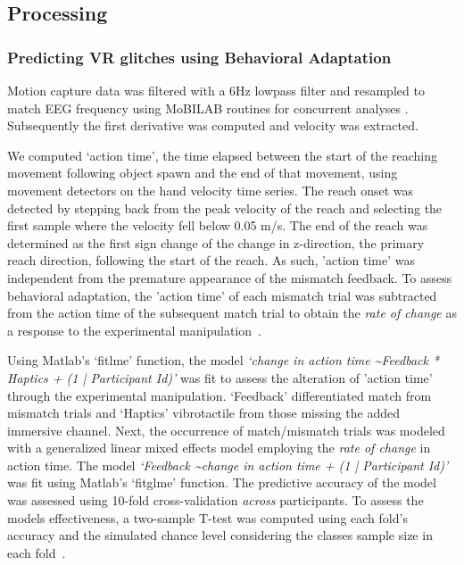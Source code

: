 \subsection{Processing}

\subsubsection{Predicting VR glitches using Behavioral Adaptation}

Motion capture data was filtered with a 6Hz lowpass filter and resampled to match EEG frequency using MoBILAB routines for concurrent analyses \cite{Ojeda2014}. Subsequently the first derivative was computed and velocity was extracted. 

We computed `action time', the time elapsed between the start of the reaching movement following object spawn and the end of that movement, using movement detectors on the hand velocity time series. The reach onset was detected by stepping back from the peak velocity of the reach and selecting the first sample where the velocity fell below 0.05 m/s. The end of the reach was determined as the first sign change of the change in z-direction, the primary reach direction, following the start of the reach. As such, 'action time' was independent from the premature appearance of the mismatch feedback. To assess behavioral adaptation, the 'action time' of each mismatch trial was subtracted from the action time of the subsequent match trial to obtain the \textit{rate of change} as a response to the experimental manipulation~\cite{Dutilh2012}.

Using Matlab's `fitlme' function, the model \textit{`change in action time \textasciitilde  Feedback * Haptics + (1 | Participant Id)'} was fit to assess the alteration of 'action time' through the experimental manipulation. `Feedback' differentiated match from mismatch trials and `Haptics' vibrotactile from those missing the added immersive channel. Next, the occurrence of match/mismatch trials was modeled with a generalized linear mixed effects model employing the \textit{rate of change} in action time. The model \textit{`Feedback \textasciitilde change in action time + (1 | Participant Id)'} was fit using Matlab's `fitglme' function. The predictive accuracy of the model was assessed using 10-fold cross-validation \textit{across} participants. To assess the models effectiveness, a two-sample T-test was computed using each fold's accuracy and the simulated chance level considering the classes sample size in each fold~\cite{Muller-Putz2007}.

